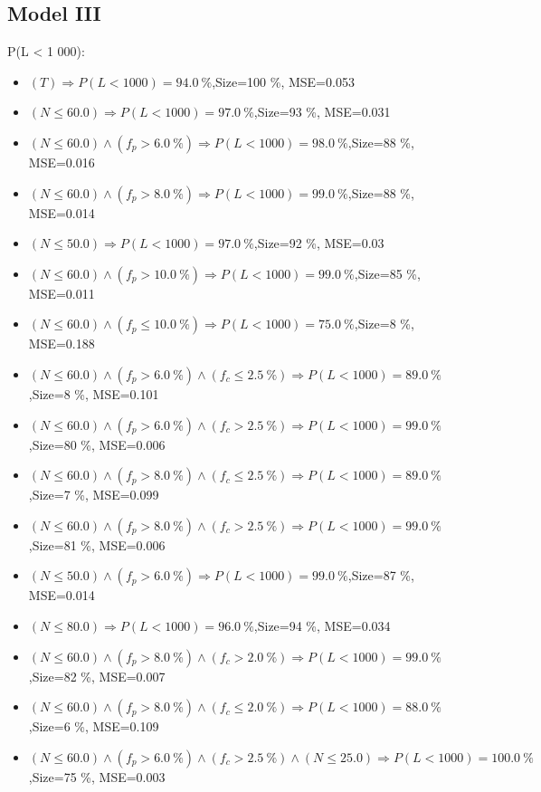 \documentclass[numbered]{CSL}
\begin{document}
\subsection{Model III}
P(L < 1 000):
\begin{itemize}
\item $(T) \Rightarrow P(L < 1 000) = 94.0~\%$,\hfill Size=100 \%, MSE=0.053
\item $(N \leq 60.0) \Rightarrow P(L < 1 000) = 97.0~\%$,\hfill Size=93 \%, MSE=0.031
\item $(N \leq 60.0) \land (f_p > 6.0~\%) \Rightarrow P(L < 1 000) = 98.0~\%$,\hfill Size=88 \%, MSE=0.016
\item $(N \leq 60.0) \land (f_p > 8.0~\%) \Rightarrow P(L < 1 000) = 99.0~\%$,\hfill Size=88 \%, MSE=0.014
\item $(N \leq 50.0) \Rightarrow P(L < 1 000) = 97.0~\%$,\hfill Size=92 \%, MSE=0.03
\item $(N \leq 60.0) \land (f_p > 10.0~\%) \Rightarrow P(L < 1 000) = 99.0~\%$,\hfill Size=85 \%, MSE=0.011
\item $(N \leq 60.0) \land (f_p \leq 10.0~\%) \Rightarrow P(L < 1 000) = 75.0~\%$,\hfill Size=8 \%, MSE=0.188
\item $(N \leq 60.0) \land (f_p > 6.0~\%) \land (f_c \leq 2.5~\%) \Rightarrow P(L < 1 000) = 89.0~\%$,\hfill Size=8 \%, MSE=0.101
\item $(N \leq 60.0) \land (f_p > 6.0~\%) \land (f_c > 2.5~\%) \Rightarrow P(L < 1 000) = 99.0~\%$,\hfill Size=80 \%, MSE=0.006
\item $(N \leq 60.0) \land (f_p > 8.0~\%) \land (f_c \leq 2.5~\%) \Rightarrow P(L < 1 000) = 89.0~\%$,\hfill Size=7 \%, MSE=0.099
\item $(N \leq 60.0) \land (f_p > 8.0~\%) \land (f_c > 2.5~\%) \Rightarrow P(L < 1 000) = 99.0~\%$,\hfill Size=81 \%, MSE=0.006
\item $(N \leq 50.0) \land (f_p > 6.0~\%) \Rightarrow P(L < 1 000) = 99.0~\%$,\hfill Size=87 \%, MSE=0.014
\item $(N \leq 80.0) \Rightarrow P(L < 1 000) = 96.0~\%$,\hfill Size=94 \%, MSE=0.034
\item $(N \leq 60.0) \land (f_p > 8.0~\%) \land (f_c > 2.0~\%) \Rightarrow P(L < 1 000) = 99.0~\%$,\hfill Size=82 \%, MSE=0.007
\item $(N \leq 60.0) \land (f_p > 8.0~\%) \land (f_c \leq 2.0~\%) \Rightarrow P(L < 1 000) = 88.0~\%$,\hfill Size=6 \%, MSE=0.109
\item $(N \leq 60.0) \land (f_p > 6.0~\%) \land (f_c > 2.5~\%) \land (N \leq 25.0) \Rightarrow P(L < 1 000) = 100.0~\%$,\hfill Size=75 \%, MSE=0.003

\end{itemize}
\end{document}
